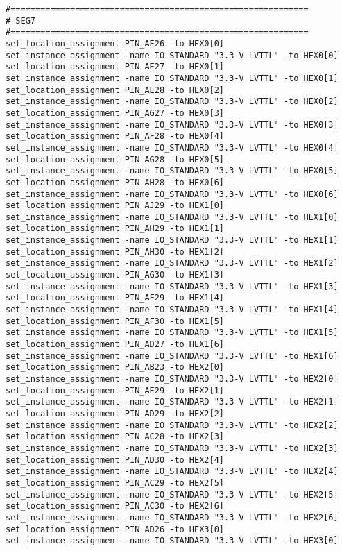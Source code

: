 \documentclass[dvipdfm]{book}
\begin{document}
\begin{verbatim}
#============================================================
# SEG7
#============================================================
set_location_assignment PIN_AE26 -to HEX0[0]
set_instance_assignment -name IO_STANDARD "3.3-V LVTTL" -to HEX0[0]
set_location_assignment PIN_AE27 -to HEX0[1]
set_instance_assignment -name IO_STANDARD "3.3-V LVTTL" -to HEX0[1]
set_location_assignment PIN_AE28 -to HEX0[2]
set_instance_assignment -name IO_STANDARD "3.3-V LVTTL" -to HEX0[2]
set_location_assignment PIN_AG27 -to HEX0[3]
set_instance_assignment -name IO_STANDARD "3.3-V LVTTL" -to HEX0[3]
set_location_assignment PIN_AF28 -to HEX0[4]
set_instance_assignment -name IO_STANDARD "3.3-V LVTTL" -to HEX0[4]
set_location_assignment PIN_AG28 -to HEX0[5]
set_instance_assignment -name IO_STANDARD "3.3-V LVTTL" -to HEX0[5]
set_location_assignment PIN_AH28 -to HEX0[6]
set_instance_assignment -name IO_STANDARD "3.3-V LVTTL" -to HEX0[6]
set_location_assignment PIN_AJ29 -to HEX1[0]
set_instance_assignment -name IO_STANDARD "3.3-V LVTTL" -to HEX1[0]
set_location_assignment PIN_AH29 -to HEX1[1]
set_instance_assignment -name IO_STANDARD "3.3-V LVTTL" -to HEX1[1]
set_location_assignment PIN_AH30 -to HEX1[2]
set_instance_assignment -name IO_STANDARD "3.3-V LVTTL" -to HEX1[2]
set_location_assignment PIN_AG30 -to HEX1[3]
set_instance_assignment -name IO_STANDARD "3.3-V LVTTL" -to HEX1[3]
set_location_assignment PIN_AF29 -to HEX1[4]
set_instance_assignment -name IO_STANDARD "3.3-V LVTTL" -to HEX1[4]
set_location_assignment PIN_AF30 -to HEX1[5]
set_instance_assignment -name IO_STANDARD "3.3-V LVTTL" -to HEX1[5]
set_location_assignment PIN_AD27 -to HEX1[6]
set_instance_assignment -name IO_STANDARD "3.3-V LVTTL" -to HEX1[6]
set_location_assignment PIN_AB23 -to HEX2[0]
set_instance_assignment -name IO_STANDARD "3.3-V LVTTL" -to HEX2[0]
set_location_assignment PIN_AE29 -to HEX2[1]
set_instance_assignment -name IO_STANDARD "3.3-V LVTTL" -to HEX2[1]
set_location_assignment PIN_AD29 -to HEX2[2]
set_instance_assignment -name IO_STANDARD "3.3-V LVTTL" -to HEX2[2]
set_location_assignment PIN_AC28 -to HEX2[3]
set_instance_assignment -name IO_STANDARD "3.3-V LVTTL" -to HEX2[3]
set_location_assignment PIN_AD30 -to HEX2[4]
set_instance_assignment -name IO_STANDARD "3.3-V LVTTL" -to HEX2[4]
set_location_assignment PIN_AC29 -to HEX2[5]
set_instance_assignment -name IO_STANDARD "3.3-V LVTTL" -to HEX2[5]
set_location_assignment PIN_AC30 -to HEX2[6]
set_instance_assignment -name IO_STANDARD "3.3-V LVTTL" -to HEX2[6]
set_location_assignment PIN_AD26 -to HEX3[0]
set_instance_assignment -name IO_STANDARD "3.3-V LVTTL" -to HEX3[0]

\end{verbatim}
\end{document}
